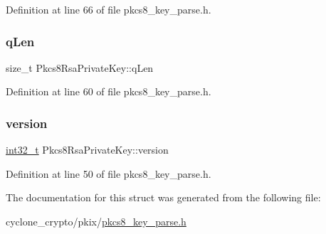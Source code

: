 Definition at line 66 of file pkcs8\+\_\+key\+\_\+parse.\+h.

\mbox{\label{structPkcs8RsaPrivateKey_a14e1e918936b22f7663dc9d4592eddce}} 
\subsubsection{\texorpdfstring{q\+Len}{qLen}}
{\footnotesize\ttfamily size\+\_\+t Pkcs8\+Rsa\+Private\+Key\+::q\+Len}



Definition at line 60 of file pkcs8\+\_\+key\+\_\+parse.\+h.

\mbox{\label{structPkcs8RsaPrivateKey_aef9252c5a9c491f2d555bcc72cc5dd3a}} 
\subsubsection{\texorpdfstring{version}{version}}
{\footnotesize\ttfamily \hyperlink{stdint_8h_ab1967d8591af1a4e48c37fd2b0f184d0}{int32\+\_\+t} Pkcs8\+Rsa\+Private\+Key\+::version}



Definition at line 50 of file pkcs8\+\_\+key\+\_\+parse.\+h.



The documentation for this struct was generated from the following file\+:\begin{DoxyCompactItemize}
\item 
cyclone\+\_\+crypto/pkix/\hyperlink{pkcs8__key__parse_8h}{pkcs8\+\_\+key\+\_\+parse.\+h}\end{DoxyCompactItemize}
